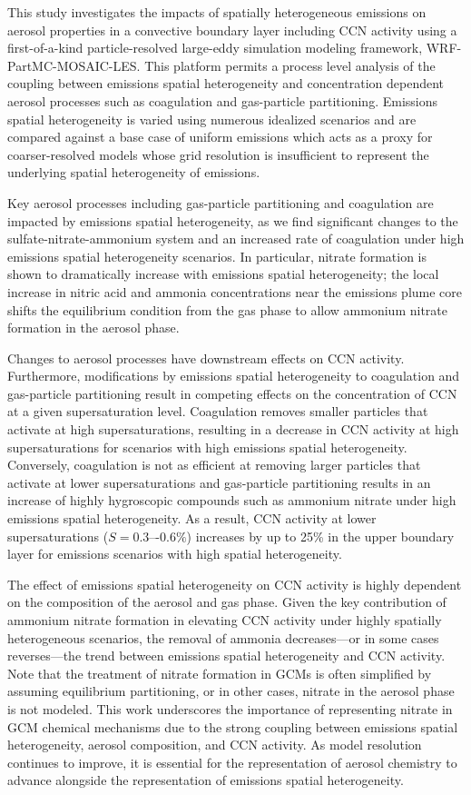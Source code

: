 \documentclass[journal abbreviation, manuscript]{copernicus}
\begin{document}
This study investigates the impacts of spatially heterogeneous emissions on aerosol properties in a convective boundary layer including CCN activity using a first-of-a-kind particle-resolved large-eddy simulation modeling framework, WRF-PartMC-MOSAIC-LES. This platform permits a process level analysis of the coupling between emissions spatial heterogeneity and concentration dependent aerosol processes such as coagulation and gas-particle partitioning. Emissions spatial heterogeneity is varied using numerous idealized scenarios and are compared against a base case of uniform emissions which acts as a proxy for coarser-resolved models whose grid resolution is insufficient to represent the underlying spatial heterogeneity of emissions.

Key aerosol processes including gas-particle partitioning and coagulation are impacted by emissions spatial heterogeneity, as we find significant changes to the sulfate-nitrate-ammonium system and an increased rate of coagulation under high emissions spatial heterogeneity scenarios. In particular, nitrate formation is shown to dramatically increase with emissions spatial heterogeneity; the local increase in nitric acid and ammonia concentrations near the emissions plume core shifts the equilibrium condition from the gas phase to allow ammonium nitrate formation in the aerosol phase. 

Changes to aerosol processes have downstream effects on CCN activity. Furthermore, modifications by emissions spatial heterogeneity to coagulation and gas-particle partitioning result in competing effects on the concentration of CCN at a given supersaturation level. Coagulation removes smaller particles that activate at high supersaturations, resulting in a decrease in CCN activity at high supersaturations for scenarios with high emissions spatial heterogeneity. Conversely, coagulation is not as efficient at removing larger particles that activate at lower supersaturations and gas-particle partitioning results in an increase of highly hygroscopic compounds such as ammonium nitrate under high emissions spatial heterogeneity. As a result, CCN activity at lower supersaturations ($S = 0.3\mbox{–-}0.6\%$) increases by up to 25\% in the upper boundary layer for emissions scenarios with high spatial heterogeneity.

The effect of emissions spatial heterogeneity on CCN activity is highly dependent on the composition of the aerosol and gas phase. Given the key contribution of ammonium nitrate formation in elevating CCN activity under highly spatially heterogeneous scenarios, the removal of ammonia decreases---or in some cases reverses---the trend between emissions spatial heterogeneity and CCN activity. Note that the treatment of nitrate formation in GCMs is often simplified by assuming equilibrium partitioning, or in other cases, nitrate in the aerosol phase is not modeled. This work underscores the importance of representing nitrate in GCM chemical mechanisms due to the strong coupling between emissions spatial heterogeneity, aerosol composition, and CCN activity. As model resolution continues to improve, it is essential for the representation of aerosol chemistry to advance alongside the representation of emissions spatial heterogeneity. 
\end{document}
